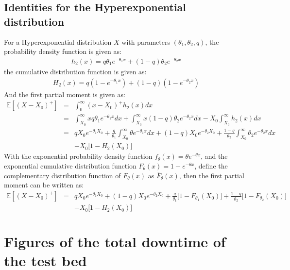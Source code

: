 \documentclass[preprint,12pt]{elsarticle}
\begin{document}
\begin{appendices}
\subsection{Identities for the Hyperexponential distribution}
\label{appendix:hyperexponential}
For a Hyperexponential distribution $X$ with parameters $(\theta_1,\theta_2,q)$, the probability density function is given as:
\begin{eqnarray}
h_{2}(x) = q\theta_{1}e^{-\theta_{1}x} + (1-q)\theta_{2}e^{-\theta_{2}x} \nonumber
\end{eqnarray}
the cumulative distribution function is given as:
\begin{eqnarray}
H_{2}(x) = q(1-e^{-\theta_{1}x})+(1-q)(1-e^{-\theta_{2}x}) \nonumber
\end{eqnarray}
And the first partial moment is given as:
\begin{eqnarray}
\mathbb{E}{[(X-X_{0})^{+}]} &=& \int^{\infty}_{0}(x-X_{0})^{+}h_{2}(x)dx \nonumber\\
&=& \int^{\infty}_{X_{0}}{xq\theta_{1}e^{-\theta_{1}x}dx} + \int^{\infty}_{X_{0}}{x(1-q)\theta_{2}e^{-\theta_{2}x}dx}-X_{0}\int_{X_{0}}^{\infty}{h_{2}(x)dx} \nonumber\\
&=& qX_{0}e^{-\theta_{1}X_{0}} + \frac{q}{\theta_{1}}\int_{X_{0}}^{\infty}{\theta e^{-\theta_{1} x}dx} + (1-q)X_{0}e^{-\theta_{2}X_{0}} + \frac{1-q}{\theta_{2}}\int_{X_{0}}^{\infty}{\theta_{2}e^{-\theta_{2}x}dx} \nonumber\\
&& -X_{0}\bigg[1-H_{2}(X_{0}) \bigg] \nonumber
\end{eqnarray}
With the exponential probability density function $f_{\theta}(x)=\theta e^{-\theta x}$, and the exponential cumulative distribution function $F_{\theta}(x)= 1-e^{-\theta x}$, define the complementary distribution function of $F_{\theta}(x)$ as $\bar{F}_{\theta}(x)$, then the first partial moment can be written as:
\begin{eqnarray}
\mathbb{E}{[(X-X_{0})^{+}]}&=& qX_{0}e^{-\theta_{1}X_{0}} + (1-q)X_{0}e^{-\theta_{2}X_{0}} + \frac{q}{\theta_{1}}\bigg[1-F_{\theta_{1}}(X_{0})\bigg]+\frac{1-q}{\theta_{2}}\bigg[1-F_{\theta_{2}}(X_{0}) \bigg] \nonumber\\
&&-X_{0}\bigg[ 1- H_{2}(X_{0})\bigg] \nonumber
\end{eqnarray}


\section{Figures of the total downtime of the test bed}


\end{appendices}
\end{document}
